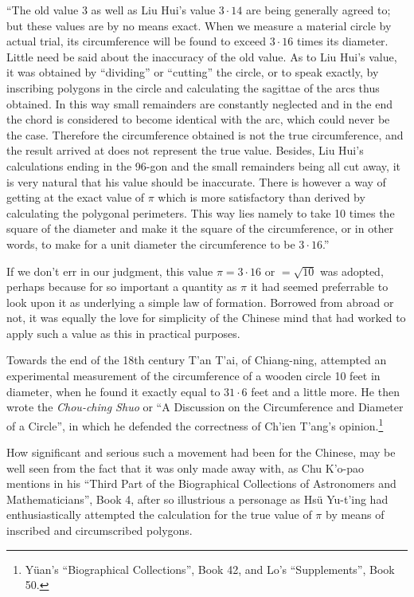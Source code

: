 \documentclass[11pt]{article}
\newcommand{\scanpage}[2]{\clearpage\setcounter{footnote}{0}\noindent{\footnotesize\color{gray}PDF page #1 · #2}\par\medskip}
\newcommand{\scanfooter}{}
\begin{document}
``The old value 3 as well as Liu Hui's value $3\cdot14$ are being generally agreed to; but these values are by no means exact. When we measure a material circle by actual trial, its circumference will be found to exceed $3\cdot16$ times its diameter. Little need be said about the inaccuracy of the old value. As to Liu Hui's value, it was obtained by ``dividing'' or ``cutting'' the circle, or to speak exactly, by inscribing polygons in the circle and calculating the sagittae of the arcs thus obtained. In this way small remainders are constantly neglected and in the end the chord is considered to become identical with the arc, which could never be the case. Therefore the circumference obtained is not the true circumference, and the result arrived at does not represent the true value. Besides, Liu Hui's calculations ending in the 96-gon and the small remainders being all cut away, it is very natural that his value should be inaccurate. There is however a way of getting at the exact value of $\pi$ which is more satisfactory than derived by calculating the polygonal perimeters. This way lies namely to take 10 times the square of the diameter and make it the square of the circumference, or in other words, to make for a unit diameter the circumference to be $3\cdot16$.''

If we don't err in our judgment, this value $\pi=3\cdot16$ or $=\sqrt{10}$ was adopted, perhaps because for so important a quantity as $\pi$ it had seemed preferrable to look upon it as underlying a simple law of formation. Borrowed from abroad or not, it was equally the love for simplicity of the Chinese mind that had worked to apply such a value as this in practical purposes.
\scanfooter

\scanpage{0152}{Chapter 20, printed page 138}
Towards the end of the 18th century T'an T'ai, of Chiang-ning, attempted an experimental measurement of the circumference of a wooden circle 10 feet in diameter, when he found it exactly equal to $31\cdot6$ feet and a little more. He then wrote the \emph{Chou-ching Shuo} or ``A Discussion on the Circumference and Diameter of a Circle'', in which he defended the correctness of Ch'ien T'ang's opinion.\footnote{Yüan's ``Biographical Collections'', Book 42, and Lo's ``Supplements'', Book 50.}

How significant and serious such a movement had been for the Chinese, may be well seen from the fact that it was only made away with, as Chu K'o-pao mentions in his ``Third Part of the Biographical Collections of Astronomers and Mathematicians'', Book 4, after so illustrious a personage as Hsü Yu-t'ing had enthusiastically attempted the calculation for the true value of $\pi$ by means of inscribed and circumscribed polygons.
\end{document}
